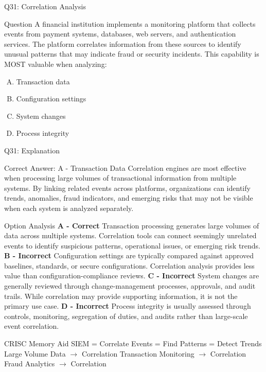 \documentclass{beamer}
\begin{document}
	
	\begin{frame}{Q31: Correlation Analysis} \begin{block}{Question} A financial institution implements a monitoring platform that collects events from payment systems, databases, web servers, and authentication services. The platform correlates information from these sources to identify unusual patterns that may indicate fraud or security incidents. This capability is MOST valuable when analyzing: \end{block} \begin{enumerate}[(A)] \item Transaction data \item Configuration settings \item System changes \item Process integrity \end{enumerate} \end{frame} \begin{frame}[shrink=10]{Q31: Explanation} \footnotesize \begin{block}{Correct Answer: A - Transaction Data} Correlation engines are most effective when processing large volumes of transactional information from multiple systems. By linking related events across platforms, organizations can identify trends, anomalies, fraud indicators, and emerging risks that may not be visible when each system is analyzed separately. \end{block} \begin{block}{Option Analysis} \textbf{A - Correct} Transaction processing generates large volumes of data across multiple systems. Correlation tools can connect seemingly unrelated events to identify suspicious patterns, operational issues, or emerging risk trends. \vspace{0.15cm} \textbf{B - Incorrect} Configuration settings are typically compared against approved baselines, standards, or secure configurations. Correlation analysis provides less value than configuration-compliance reviews. \vspace{0.15cm} \textbf{C - Incorrect} System changes are generally reviewed through change-management processes, approvals, and audit trails. While correlation may provide supporting information, it is not the primary use case. \vspace{0.15cm} \textbf{D - Incorrect} Process integrity is usually assessed through controls, monitoring, segregation of duties, and audits rather than large-scale event correlation. \end{block} \begin{block}{CRISC Memory Aid} SIEM = Correlate Events = Find Patterns = Detect Trends \vspace{0.15cm} Large Volume Data $\rightarrow$ Correlation Transaction Monitoring $\rightarrow$ Correlation Fraud Analytics $\rightarrow$ Correlation \end{block} \end{frame}
	
\end{document}
